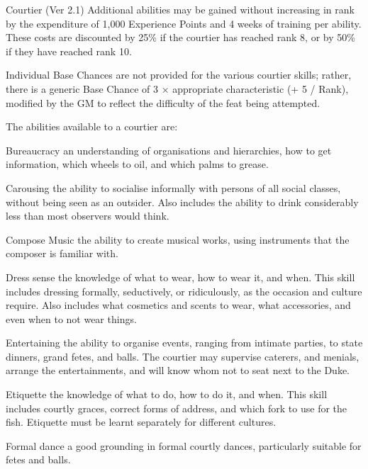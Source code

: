 \begin{Chapter}{Courtier (Ver 2.1)}
Additional abilities may be gained without increasing in rank by the
expenditure of 1,000 Experience Points and 4 weeks of training per
ability.  These costs are discounted by 25\% if the courtier has
reached rank 8, or by 50\% if they have reached rank 10.

Individual Base Chances are not provided for the various courtier
skills; rather, there is a generic Base Chance of 3 × appropriate
characteristic (+ 5 / Rank), modified by the GM to reflect the
difficulty of the feat being attempted.

The abilities available to a courtier are:

\begin{Description}
\item[Bureaucracy] an understanding of organisations and hierarchies,
  how to get information, which wheels to oil, and which palms to
  grease.

\item[Carousing] the ability to socialise informally with persons of
  all social classes, without being seen as an outsider.  Also
  includes the ability to drink considerably less than most observers
  would think.

\item[Compose Music] the ability to create musical works, using
  instruments that the composer is familiar with.

\item[Dress sense] the knowledge of what to wear, how to wear it, and
  when.  This skill includes dressing formally, seductively, or
  ridiculously, as the occasion and culture require.  Also includes
  what cosmetics and scents to wear, what accessories, and even when
  to not wear things.

\item[Entertaining] the ability to organise events, ranging from
  intimate parties, to state dinners, grand fetes, and balls.  The
  courtier may supervise caterers, and menials, arrange the
  entertainments, and will know whom not to seat next to the Duke.

\item[Etiquette] the knowledge of what to do, how to do it, and when.
  This skill includes courtly graces, correct forms of address, and
  which fork to use for the fish.  Etiquette must be learnt separately
  for different cultures.

\item[Formal dance] a good grounding in formal courtly dances,
  particularly suitable for fetes and balls.


\end{Description}
\end{Chapter}
